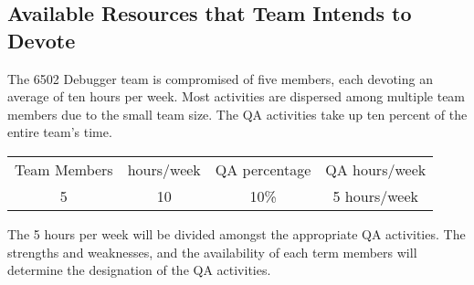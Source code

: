 \documentclass[a3paper, 11pt]{article}
\begin{document}
\subsection{Available Resources that Team Intends to Devote}
The 6502 Debugger team is compromised of five members, each devoting an average of ten hours per week. Most activities are dispersed among multiple team members due to the small team size. The QA activities take up ten percent of the entire team's time.
\begin{center}
	\centering
	\begin{tabular}{cccc}
		Team Members & hours/week & QA percentage & QA hours/week \\
		5 & 10 & 10\% & 5 hours/week \\ 
	\end{tabular}
\end{center}
The 5 hours per week will be divided amongst the appropriate QA activities. The strengths and weaknesses, and the availability of each term members will determine the designation of the QA activities. 
\end{document}
